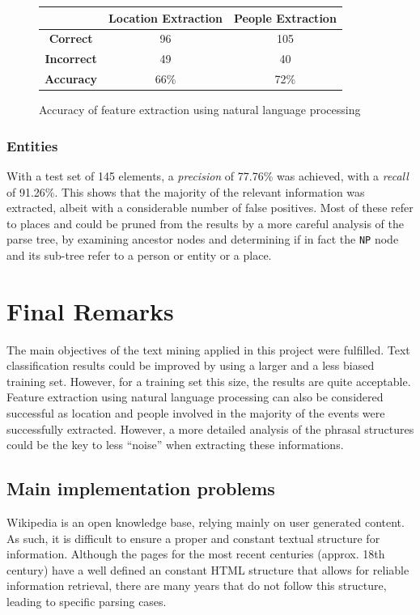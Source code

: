 \documentclass{llncs}
\begin{document}
\begin{figure}[h!]
	\centering
	\begin{tabular}{c|c|c}
		& \textbf{Location Extraction} & \textbf{People Extraction} \\
		\hline
		\textbf{Correct}   & 96 & 105 \\
		\textbf{Incorrect} & 49 & 40 \\
		\hline
		\textbf{Accuracy}  & 66\% & 72\% \\
	\end{tabular}
	\caption{Accuracy of feature extraction using natural language processing}
	\label{fig:feature-extraction-accuracy}
\end{figure}

\subsubsection{Entities}

With a test set of 145 elements, a \textit{precision} of 77.76\% was achieved, with a \textit{recall} of 91.26\%. This shows that the majority of the relevant information was extracted, albeit with a considerable number of false positives. Most of these refer to places and could be pruned from the results by a more careful analysis of the parse tree, by examining ancestor nodes and determining if in fact the \verb!NP! node and its sub-tree refer to a person or entity or a place.

\section{Final Remarks}

The main objectives of the text mining applied in this project were fulfilled. Text classification results could be improved by using a larger and a less biased training set. However, for a training set this size, the results are quite acceptable. Feature extraction using natural language processing can also be considered successful as location and people involved in the majority of the events were successfully extracted. However, a more detailed analysis of the phrasal structures could be the key to less ``noise'' when extracting these informations.

\subsection{Main implementation problems}

Wikipedia is an open knowledge base, relying mainly on user generated content. As such, it is difficult to ensure a proper and constant textual structure for information. Although the pages for the most recent centuries (approx. 18th century) have a well defined an constant HTML structure that allows for reliable information retrieval, there are many years that do not follow this structure, leading to specific parsing cases.\\
\end{document}
